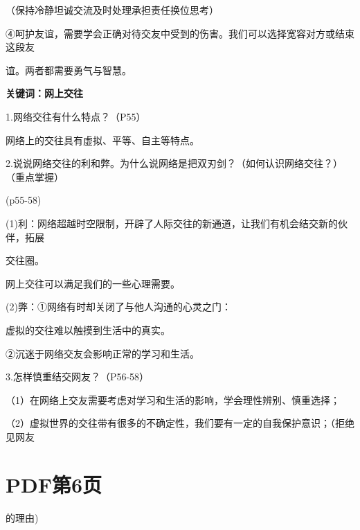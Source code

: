 \documentclass[lang=cn,11pt]{elegantbook}
\newcommand{\daofasym}[1]{{\daofasymbolfont #1}}
\newcommand{\daofasym}[1]{#1}
\begin{document}
（保持冷静坦诚交流及时处理承担责任换位思考）\par

\daofasym{④}呵护友谊，需要学会正确对待交友中受到的伤害。我们可以选择宽容对方或结束这段友\par

谊。两者都需要勇气与智慧。\par

\textbf{关键词：网上交往}\par

1.网络交往有什么特点？（P55）\par

网络上的交往具有虚拟、平等、自主等特点。\par

2.说说网络交往的利和弊。为什么说网络是把双刃剑？（如何认识网络交往？）（重点掌握）\par

(p55-58)\par

(1)利：网络超越时空限制，开辟了人际交往的新通道，让我们有机会结交新的伙伴，拓展\par

交往圈。\par

网上交往可以满足我们的一些心理需要。\par

(2)弊：\daofasym{①}网络有时却关闭了与他人沟通的心灵之门：\par

虚拟的交往难以触摸到生活中的真实。\par

\daofasym{②}沉迷于网络交友会影响正常的学习和生活。\par

3.怎样慎重结交网友？（P56-58）\par

（1）在网络上交友需要考虑对学习和生活的影响，学会理性辨别、慎重选择；\par

（2）虚拟世界的交往带有很多的不确定性，我们要有一定的自我保护意识；（拒绝见网友\par


\section*{PDF第6页}

的理由)\par
\end{document}
